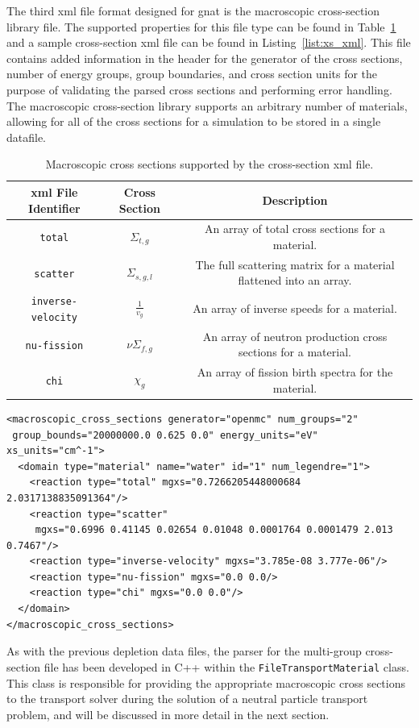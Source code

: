 The third \acrshort{xml} file format designed for \acrshort{gnat} is the macroscopic cross-section library file. The supported properties for this file type can be found in Table~\ref{table:xml_cross_section} and a sample cross-section \acrshort{xml} file can be found in Listing~\ref{list:xs_xml}. This file contains added information in the header for the generator of the cross sections, number of energy groups, group boundaries, and cross section units for the purpose of validating the parsed cross sections and performing error handling. The macroscopic cross-section library supports an arbitrary number of materials, allowing for all of the cross sections for a simulation to be stored in a single datafile.
\begin{table}[H]
    \centering
    \caption{Macroscopic cross sections supported by the cross-section \acrshort{xml} file.}
    \begin{tabular}{|c|c|c|}
        \hline
        \acrshort{xml} \textbf{File Identifier} & \textbf{Cross Section} & \textbf{Description}\\
        \hline
        \texttt{total} & $\Sigma_{t,g}$ & An array of total cross sections for a material.\\
        \texttt{scatter} & $\Sigma_{s,g,l}$ & The full scattering matrix for a material flattened into an array.\\
        \texttt{inverse-velocity} & $\frac{1}{v_{g}}$ & An array of inverse speeds for a material.\\
        \texttt{nu-fission} & $\nu\Sigma_{f,g}$ & An array of neutron production cross sections for a material.\\
        \texttt{chi} & $\chi_{g}$ & An array of fission birth spectra for the material.\\
        \hline
    \end{tabular}
    \label{table:xml_cross_section}
\end{table}
\begin{lstlisting}[label={list:xs_xml}, caption={Example macroscopic cross-section \acrshort{xml} file.}]
<macroscopic_cross_sections generator="openmc" num_groups="2" 
 group_bounds="20000000.0 0.625 0.0" energy_units="eV" xs_units="cm^-1">
  <domain type="material" name="water" id="1" num_legendre="1">
    <reaction type="total" mgxs="0.7266205448000684 2.0317138835091364"/>
    <reaction type="scatter" 
     mgxs="0.6996 0.41145 0.02654 0.01048 0.0001764 0.0001479 2.013 0.7467"/>
    <reaction type="inverse-velocity" mgxs="3.785e-08 3.777e-06"/>
    <reaction type="nu-fission" mgxs="0.0 0.0/>
    <reaction type="chi" mgxs="0.0 0.0"/>
  </domain>
</macroscopic_cross_sections>
\end{lstlisting}
As with the previous depletion data files, the parser for the multi-group cross-section file has been developed in C++ within the \texttt{FileTransportMaterial} class. This class is responsible for providing the appropriate macroscopic cross sections to the transport solver during the solution of a neutral particle transport problem, and will be discussed in more detail in the next section. 

